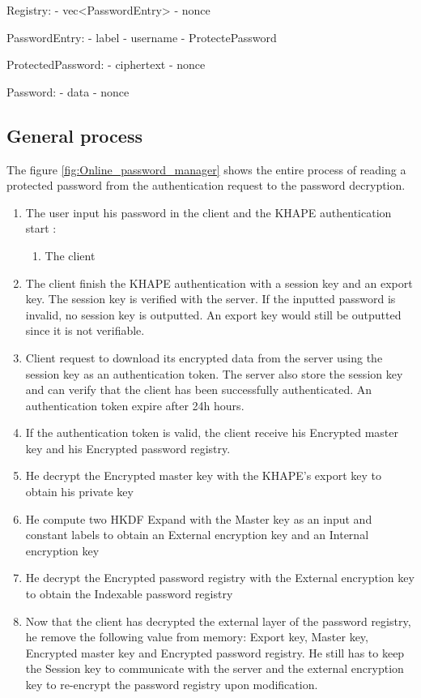 \documentclass[../report.tex]{subfiles}
\begin{document}
Registry:
- vec<PasswordEntry>
- nonce

PasswordEntry:
- label
- username
- ProtectePassword

ProtectedPassword:
- ciphertext
- nonce

Password:
- data
- nonce


\subsection{General process}

The figure \ref{fig:Online_password_manager} shows the entire process of reading a protected password from the authentication request to the password decryption.

\begin{enumerate}
 \item The user input his password in the client and the KHAPE authentication start :
 \begin{enumerate}
  \item The client
 \end{enumerate}
 \item The client finish the KHAPE authentication with a session key and an export key. The session key is verified with the server. If the inputted password is invalid, no session key is outputted. An export key would still be outputted since it is not verifiable.
 \item Client request to download its encrypted data from the server using the session key as an authentication token. The server also store the session key and can verify that the client has been successfully authenticated. An authentication token expire after 24h hours.
 \item If the authentication token is valid, the client receive his Encrypted master key and his Encrypted password registry.
 \item He decrypt the Encrypted master key with the KHAPE's export key to obtain his private key
 \item He compute two HKDF Expand with the Master key as an input and constant labels to obtain an External encryption key and an Internal encryption key
 \item He decrypt the Encrypted password registry with the External encryption key to obtain the Indexable password registry
 \item Now that the client has decrypted the external layer of the password registry, he remove the following value from memory: Export key, Master key, Encrypted master key and Encrypted password registry. He still has to keep the Session key to communicate with the server and the external encryption key to re-encrypt the password registry upon modification.

\end{enumerate}
\end{document}
